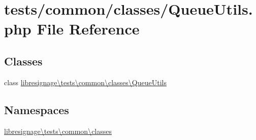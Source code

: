 \hypertarget{QueueUtils_8php}{}\section{tests/common/classes/\+Queue\+Utils.php File Reference}
\label{QueueUtils_8php}
\subsection*{Classes}
\begin{DoxyCompactItemize}
\item 
class \hyperlink{classlibresignage_1_1tests_1_1common_1_1classes_1_1QueueUtils}{libresignage\textbackslash{}tests\textbackslash{}common\textbackslash{}classes\textbackslash{}\+Queue\+Utils}
\end{DoxyCompactItemize}
\subsection*{Namespaces}
\begin{DoxyCompactItemize}
\item 
 \hyperlink{namespacelibresignage_1_1tests_1_1common_1_1classes}{libresignage\textbackslash{}tests\textbackslash{}common\textbackslash{}classes}
\end{DoxyCompactItemize}
